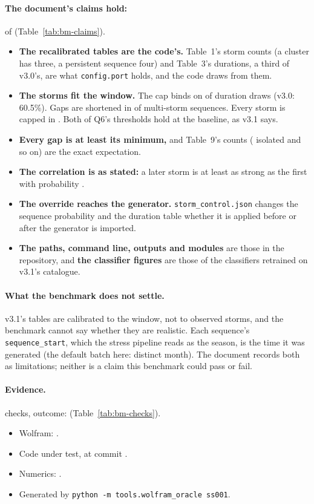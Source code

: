 \documentclass[11pt,a4paper]{article}
\begin{document}
\paragraph{The document's claims hold:} \bmClaimsMet{} of \bmClaims{}
(Table~\ref{tab:bm-claims}).
\begin{itemize}[leftmargin=*,nosep]
\item \textbf{The recalibrated tables are the code's.} Table~1's storm counts (a cluster
  has three, a persistent sequence four) and Table~3's durations, a third of v3.0's, are
  what \texttt{config.port} holds, and the code draws from them.
\item \textbf{The storms fit the window.} The cap binds on \bmCapPct{} of duration draws
  (v3.0: 60.5\%). Gaps are shortened in \bmShortPct{} of multi-storm sequences. Every storm
  is capped in \bmPinnedPct{}. Both of Q6's thresholds hold at the baseline, as v3.1 says.
\item \textbf{Every gap is at least its minimum,} and Table~9's counts (\bmIsolated{}
  isolated and so on) are the exact expectation.
\item \textbf{The correlation is as stated:} a later storm is at least as strong as the
  first with probability \bmSubsequent.
\item \textbf{The override reaches the generator.} \texttt{storm\_control.json} changes the
  sequence probability and the duration table whether it is applied before or after the
  generator is imported.
\item \textbf{The paths, command line, outputs and modules} are those in the repository,
  and \textbf{the classifier figures} are those of the classifiers retrained on v3.1's
  catalogue.
\end{itemize}

\paragraph{What the benchmark does not settle.} v3.1's tables are calibrated to the
window, not to observed storms, and the benchmark cannot say whether they are realistic.
Each sequence's \texttt{sequence\_start}, which the stress pipeline reads as the season, is
the time it was generated (the default batch here: \bmSeasonMonths{} distinct month). The
document records both as limitations; neither is a claim this benchmark could pass or
fail.

\paragraph{Evidence.} \bmChecks{} checks, outcome: \bmOutcome{}
(Table~\ref{tab:bm-checks}).
\begin{itemize}[leftmargin=*,nosep]
\item Wolfram: \bmWolfram{}\bmWolframVia.
\item Code under test, at commit \bmCodeCommit{}\bmCodeDirty.
\item Numerics: \bmNumerics.
\item Generated \bmGenerated{} by \texttt{python -m tools.wolfram\_oracle ss001}.
\end{itemize}
\end{document}
